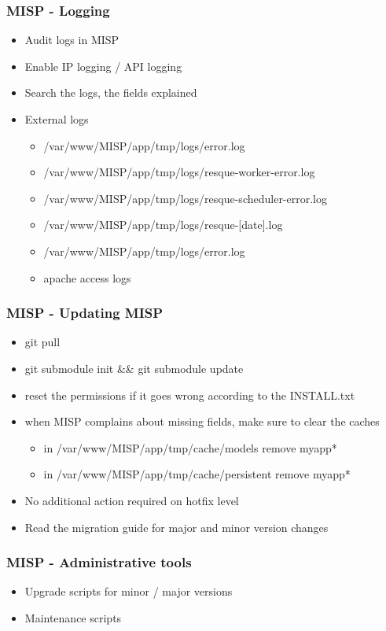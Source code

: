\begin{frame}
    \frametitle{MISP - Logging}
        \begin{itemize}
            \item Audit logs in MISP
            \item Enable IP logging / API logging
            \item Search the logs, the fields explained
            \item External logs
            \begin{itemize}
                \item /var/www/MISP/app/tmp/logs/error.log
                \item /var/www/MISP/app/tmp/logs/resque-worker-error.log
                \item /var/www/MISP/app/tmp/logs/resque-scheduler-error.log
                \item /var/www/MISP/app/tmp/logs/resque-[date].log
                \item /var/www/MISP/app/tmp/logs/error.log
                \item apache access logs
            \end{itemize}
        \end{itemize}
\end{frame}

\begin{frame}
    \frametitle{MISP - Updating MISP}
        \begin{itemize}
            \item git pull
            \item git submodule init \&\& git submodule update
            \item reset the permissions if it goes wrong according to the INSTALL.txt
            \item when MISP complains about missing fields, make sure to clear the caches
            \begin{itemize}
                \item in /var/www/MISP/app/tmp/cache/models remove myapp*
                \item in /var/www/MISP/app/tmp/cache/persistent remove myapp*
            \end{itemize}
            \item No additional action required on hotfix level
            \item Read the migration guide for major and minor version changes
        \end{itemize}
\end{frame}

\begin{frame}
    \frametitle{MISP - Administrative tools}
        \begin{itemize}
            \item Upgrade scripts for minor / major versions
            \item Maintenance scripts
        \end{itemize}
\end{frame}

